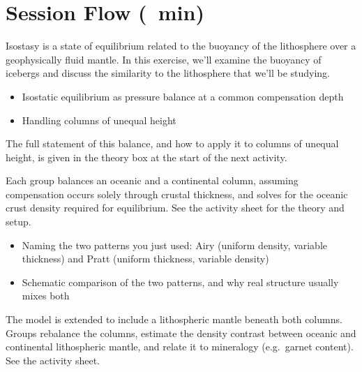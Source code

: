\section*{Session Flow (\timelinelength\ min)}


Isostasy is a state of equilibrium related to the buoyancy of the lithosphere over a geophysically fluid mantle. In this exercise, we'll examine the buoyancy of icebergs and discuss the similarity to the lithosphere that we'll be studying.


\begin{itemize}
    \item Isostatic equilibrium as pressure balance at a common compensation depth
    \item Handling columns of unequal height
\end{itemize}

The full statement of this balance, and how to apply it to columns of unequal height, is given in the theory box at the start of the next activity.


Each group balances an oceanic and a continental column, assuming compensation occurs solely through crustal thickness, and solves for the oceanic crust density required for equilibrium. See the activity sheet for the theory and setup.


\begin{itemize}
    \item Naming the two patterns you just used: Airy (uniform density, variable thickness) and Pratt (uniform thickness, variable density)
    \item Schematic comparison of the two patterns, and why real structure usually mixes both
\end{itemize}


The model is extended to include a lithospheric mantle beneath both columns. Groups rebalance the columns, estimate the density contrast between oceanic and continental lithospheric mantle, and relate it to mineralogy (e.g.\ garnet content). See the activity sheet.


